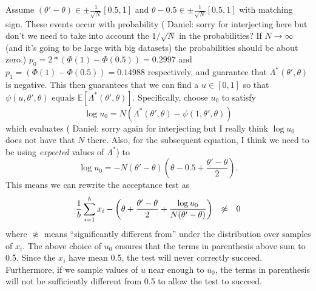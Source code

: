 \documentclass{article}
\begin{document}
Assume $(\theta' - \theta) \in \pm\frac{1}{\sqrt{N}}[0.5,1]$ and $\theta -0.5
\in \pm\frac{1}{\sqrt{N}}[0.5,1]$ with matching sign. These events occur with
probability ({\color{blue} Daniel: sorry for interjecting here but don't we need
to take into account the $1/\sqrt{N}$ in the probabilities? If $N \to \infty$
(and it's going to be large with big datasets) the probabilities should be about
zero.}) $p_0=2*(\Phi(1)-\Phi(0.5)) = 0.2997$ and
$p_1=(\Phi(1)-\Phi(0.5))=0.14988$ respectively, and guarantee that
$\Lambda^*(\theta',\theta)$ is negative. This then guarantees that we can find a
$u \in [0,1]$ so that $\psi(u,\theta',\theta)$ equals
$\mathbb{E}[\Lambda^*(\theta',\theta)]$.  Specifically, choose $u_0$ to satisfy
\begin{equation}\label{eq:log_uo}
    \log u_0 = N(\Lambda^*(\theta',\theta)-\psi(1,\theta',\theta))
\end{equation}
which evaluates ({\color{blue} Daniel: sorry again for interjecting but I really
think $\log u_0$ does not have that $N$ there. Also, for the subsequent
equation, I think we need to be using \emph{expected} values of $\Lambda^*$}) to
\begin{equation}
    \log u_0 = -N(\theta'-\theta)\left(\theta-0.5+\frac{\theta'-\theta}{2}\right).
\end{equation}
This means we can rewrite the acceptance test as
\begin{equation}
    \frac{1}{b}\sum_{i=1}^b x_i-\left(\theta+\frac{\theta'-\theta}{2} + \frac{\log u_0}{N(\theta'-\theta)}\right)
    \hspace{0.1in} \not\approx \hspace{0.1in} 0
\end{equation}
where $\not\approx$ means ``significantly different from'' under the
distribution over samples of $x_i$.  The above choice of $u_0$ ensures that the
terms in parenthesis above sum to 0.5. Since the $x_i$ have mean 0.5, the test
will never correctly succeed.  Furthermore, if we sample values of $u$ near
enough to $u_0$, the terms in parenthesis will not be sufficiently different
from 0.5 to allow the test to succeed. 
  
\end{document}
